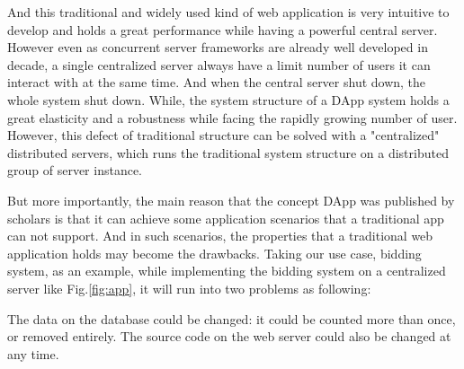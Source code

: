 And this traditional and widely used kind of web application is very intuitive to develop and holds a great performance while having a powerful central server. However even as concurrent server frameworks are already well developed in decade, a single centralized server always have a limit number of users it can interact with at the same time. And when the central server shut down, the whole system shut down. While, the system structure of a DApp system holds a great elasticity and a robustness while facing the rapidly growing number of user. However, this defect of traditional structure can be solved with a "centralized" distributed servers, which runs the traditional system structure on a distributed group of server instance.

But more importantly, the main reason that the concept DApp was published by scholars is that it can achieve some application scenarios that a traditional app can not support. And in such scenarios, the properties that a traditional web application holds may become the drawbacks. Taking our use case, bidding system, as an example, while implementing the bidding system on a centralized server like Fig.\ref{fig:app}, it will run into two problems as following:
\begin{addmargin}[2em]{0em}

The data on the database could be changed: it could be counted more than once, or removed entirely. \newline The source code on the web server could also be changed at any time.
\end{addmargin}
